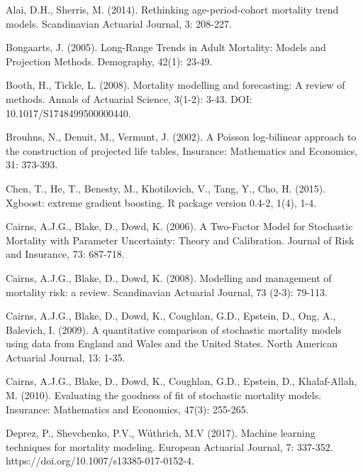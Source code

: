 \documentclass[fleqn,10pt]{wlscirep}
\begin{document}
%
\begin{thebibliography}{99}

Alai, D.H., Sherris, M. (2014). Rethinking age-period-cohort mortality trend models. Scandinavian Actuarial Journal, 3: 208-227.

Bongaarts, J. (2005). Long-Range Trends in Adult Mortality: Models and Projection Methods. Demography, 42(1): 23-49.

Booth, H., Tickle, L. (2008). Mortality modelling and forecasting: A review of methods. Annals of Actuarial Science, 3(1-2): 3-43. DOI: 10.1017/S1748499500000440.

Brouhns, N., Denuit, M., Vermunt, J. (2002). A Poisson log-bilinear approach to the construction of projected life tables, Insurance: Mathematics and Economics, 31: 373-393.

Chen, T., He, T., Benesty, M., Khotilovich, V., Tang, Y., Cho, H. (2015). Xgboost: extreme gradient boosting. R package version 0.4-2, 1(4), 1-4.

Cairns, A.J.G., Blake, D., Dowd, K. (2006). A Two-Factor Model for Stochastic Mortality with Parameter Uncertainty: Theory and Calibration. Journal of Risk and Insurance, 73: 687-718.

Cairns, A.J.G., Blake, D., Dowd, K. (2008). Modelling and management of mortality risk: a review. Scandinavian Actuarial Journal, 73 (2-3): 79-113.

Cairns, A.J.G., Blake, D., Dowd, K., Coughlan, G.D., Epstein, D., Ong, A., Balevich, I. (2009). A quantitative comparison of stochastic mortality models using data from England and Wales and the United States. North American Actuarial Journal, 13: 1-35.

Cairns, A.J.G., Blake, D., Dowd, K., Coughlan, G.D., Epstein, D., Khalaf-Allah, M. (2010). Evaluating the goodness of fit of stochastic mortality models. Insurance: Mathematics and Economics, 47(3): 255-265.

Deprez, P., Shevchenko, P.V., W\'uthrich, M.V (2017). Machine learning techniques for mortality modeling. European Actuarial Journal, 7: 337-352. https://doi.org/10.1007/s13385-017-0152-4.


\end{thebibliography}
\end{document}

